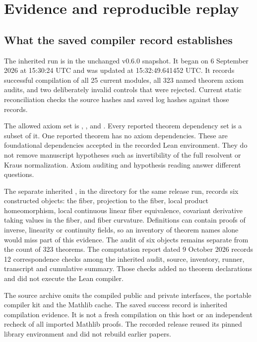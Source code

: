 \section{Evidence and reproducible replay}
\label{sec:replay}

\subsection{What the saved compiler record establishes}
The inherited run is  in the unchanged v0.6.0 snapshot. It began on 6 September 2026 at 15:30:24 UTC and was updated at 15:32:49.641452 UTC. It records successful compilation of all 25 current modules, all 323 named theorem axiom audits, and two deliberately invalid controls that were rejected. Current static reconciliation checks the source hashes and saved log hashes against those records.

The allowed axiom set is , , and . Every reported theorem dependency set is a subset of it. One reported theorem has no axiom dependencies. These are foundational dependencies accepted in the recorded Lean environment. They do not remove manuscript hypotheses such as invertibility of the full resolvent or Kraus normalization. Axiom auditing and hypothesis reading answer different questions.

The separate inherited , in the directory for the same release run, records six constructed objects: the fiber, projection to the fiber, local product homeomorphism, local continuous linear fiber equivalence, covariant derivative taking values in the fiber, and fiber curvature. Definitions can contain proofs of inverse, linearity or continuity fields, so an inventory of theorem names alone would miss part of this evidence. The audit of six objects remains separate from the count of 323 theorems. The computation report dated 9 October 2026 records 12 correspondence checks among the inherited audit, source, inventory, runner, transcript and cumulative summary. Those checks added no theorem declarations and did not execute the Lean compiler.

The source archive omits the compiled public and private interfaces, the portable compiler kit and the Mathlib cache. The saved success record is inherited compilation evidence. It is not a fresh compilation on this host or an independent recheck of all imported Mathlib proofs. The recorded release reused its pinned library environment and did not rebuild earlier papers.

